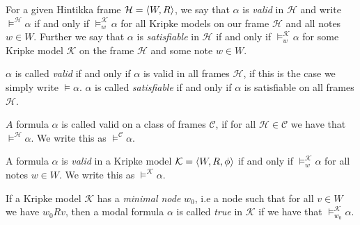 \documentclass[../main.tex]{subfiles}
\begin{document}
\begin{defi}
For a given Hintikka frame $\mathcal{H}=\langle W,R\rangle$, we say that $\alpha$ is
\textit{valid} in $\mathcal{H}$ and write $\vDash^\mathcal{H}\alpha$ if and only if
$\vDash^\mathcal{K}_w\alpha$ for all Kripke models on our frame $\mathcal{H}$ and all
notes $w\in W$. Further we say that $\alpha$ is \textit{satisfiable} in $\mathcal{H}$
if and only if $\vDash^\mathcal{K}_w\alpha$ for some Kripke model $\mathcal{K}$ on
the frame $\mathcal{H}$ and some note $w\in W$.

$\alpha$ is called \textit{valid} if and only if $\alpha$ is valid in all frames
$\mathcal{H}$, if this is the case we simply write $\vDash\alpha$. $\alpha$ is
called \textit{satisfiable} if and only if $\alpha$ is satisfiable on all frames
$\mathcal{H}$.

$A$ formula $\alpha$ is called valid on a class of frames $\mathcal{C}$, if for
all $\mathcal{H}\in\mathcal{C}$ we have that $\vDash^\mathcal{H}\alpha$. We
write this as $\vDash^\mathcal{C}\alpha$.

A formula $\alpha$ is \textit{valid} in a Kripke model $\mathcal{K}=\langle
W,R,\phi\rangle$ if and only if $\vDash^\mathcal{K}_w\alpha$ for all notes $w\in
W$. We write this as $\vDash^\mathcal{K}\alpha$.

If a Kripke model $\mathcal{K}$ has a \textit{minimal node} $w_0$, i.e a node
such that for all $v\in W$ we have $w_0Rv$, then a modal formula $\alpha$ is
called  \textit{true} in $\mathcal{K}$ if we have that
$\vDash_{w_0}^\mathcal{K}\alpha$.
\end{defi}
\end{document}
